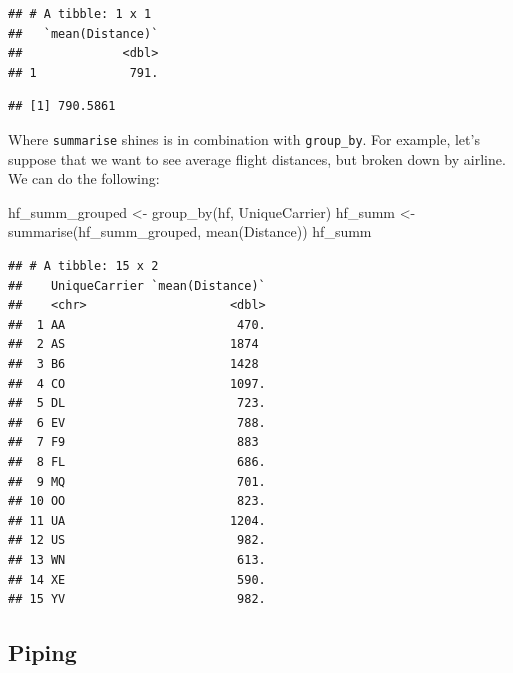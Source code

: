 \documentclass[
]{book}
\newenvironment{Shaded}{\begin{snugshade}}{\end{snugshade}}
\newcommand{\FunctionTok}[1]{\textcolor[rgb]{0.00,0.00,0.00}{#1}}
\newcommand{\NormalTok}[1]{#1}
\newcommand{\OtherTok}[1]{\textcolor[rgb]{0.56,0.35,0.01}{#1}}
\newcommand{\SpecialCharTok}[1]{\textcolor[rgb]{0.00,0.00,0.00}{#1}}
\begin{document}
\begin{verbatim}
## # A tibble: 1 x 1
##   `mean(Distance)`
##              <dbl>
## 1             791.
\end{verbatim}

\begin{Shaded}
\end{Shaded}

\begin{verbatim}
## [1] 790.5861
\end{verbatim}

Where \texttt{summarise} shines is in combination with \texttt{group\_by}. For example, let's suppose that we want to see average flight distances, but broken down by airline. We can do the following:

\begin{Shaded}
\begin{Highlighting}[]
\NormalTok{hf\_summ\_grouped }\OtherTok{\textless{}{-}} \FunctionTok{group\_by}\NormalTok{(hf, UniqueCarrier)}
\NormalTok{hf\_summ }\OtherTok{\textless{}{-}} \FunctionTok{summarise}\NormalTok{(hf\_summ\_grouped, }\FunctionTok{mean}\NormalTok{(Distance))}
\NormalTok{hf\_summ}
\end{Highlighting}
\end{Shaded}

\begin{verbatim}
## # A tibble: 15 x 2
##    UniqueCarrier `mean(Distance)`
##    <chr>                    <dbl>
##  1 AA                        470.
##  2 AS                       1874 
##  3 B6                       1428 
##  4 CO                       1097.
##  5 DL                        723.
##  6 EV                        788.
##  7 F9                        883 
##  8 FL                        686.
##  9 MQ                        701.
## 10 OO                        823.
## 11 UA                       1204.
## 12 US                        982.
## 13 WN                        613.
## 14 XE                        590.
## 15 YV                        982.
\end{verbatim}

\hypertarget{manipulating-piping}{%
\subsection{Piping}\label{manipulating-piping}}
\end{document}
